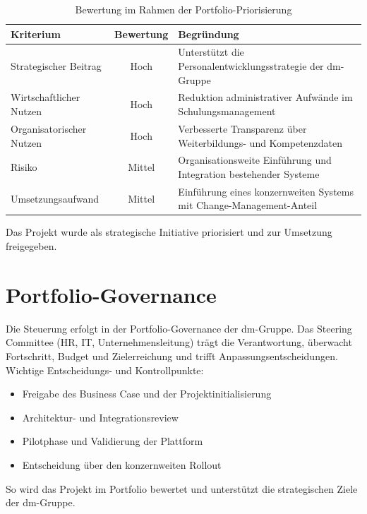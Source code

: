 \begin{xltabular}{\textwidth}{@{}lcX@{}}
    \caption{Bewertung im Rahmen der Portfolio-Priorisierung} \label{tab:portfolio-priorisierung} \\
    \hline
    \textbf{Kriterium}       & \textbf{Bewertung} & \textbf{Begründung}                                                 \\
    \hline
    Strategischer Beitrag    & Hoch               & Unterstützt die Personalentwicklungsstrategie der dm-Gruppe         \\

    Wirtschaftlicher Nutzen  & Hoch               & Reduktion administrativer Aufwände im Schulungsmanagement           \\

    Organisatorischer Nutzen & Hoch               & Verbesserte Transparenz über Weiterbildungs- und Kompetenzdaten     \\

    Risiko                   & Mittel             & Organisationsweite Einführung und Integration bestehender Systeme   \\

    Umsetzungsaufwand        & Mittel             & Einführung eines konzernweiten Systems mit Change-Management-Anteil \\
    \hline
\end{xltabular}

Das Projekt wurde als strategische Initiative priorisiert und zur Umsetzung freigegeben.

\section{Portfolio-Governance}

Die Steuerung erfolgt in der Portfolio-Governance der dm-Gruppe. Das Steering Committee (\ac{HR}, \ac{IT}, Unternehmensleitung) trägt die Verantwortung, überwacht Fortschritt, Budget und Zielerreichung und trifft Anpassungsentscheidungen. Wichtige Entscheidungs- und Kontrollpunkte:

\begin{itemize}
    \item Freigabe des Business Case und der Projektinitialisierung
    \item Architektur- und Integrationsreview
    \item Pilotphase und Validierung der Plattform
    \item Entscheidung über den konzernweiten Rollout
\end{itemize}

So wird das Projekt im Portfolio bewertet und unterstützt die strategischen Ziele der dm-Gruppe.